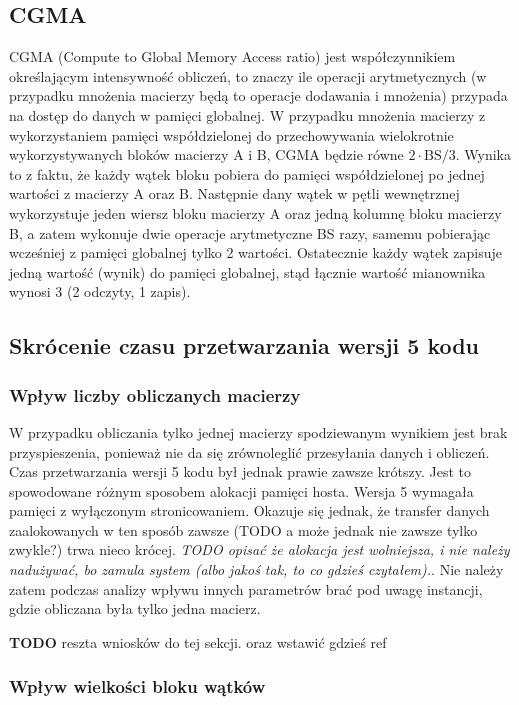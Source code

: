 \documentclass[12pt,a4paper]{article}
\begin{document}
\subsection{CGMA}

CGMA (Compute to Global Memory Access ratio) jest współczynnikiem określającym intensywność obliczeń, to znaczy ile operacji arytmetycznych (w przypadku mnożenia macierzy będą to operacje dodawania i mnożenia) przypada na dostęp do danych w pamięci globalnej. W przypadku mnożenia macierzy z wykorzystaniem pamięci współdzielonej do przechowywania wielokrotnie wykorzystywanych bloków macierzy A i B, CGMA będzie równe $2 \cdot \text{BS} / 3$. Wynika to z faktu, że każdy wątek bloku pobiera do pamięci współdzielonej po jednej wartości z macierzy A oraz B. Następnie dany wątek w pętli wewnętrznej wykorzystuje jeden wiersz bloku macierzy A oraz jedną kolumnę bloku macierzy B, a zatem wykonuje dwie operacje arytmetyczne BS razy, samemu pobierając wcześniej z pamięci globalnej tylko 2 wartości. Ostatecznie każdy wątek zapisuje jedną wartość (wynik) do pamięci globalnej, stąd łącznie wartość mianownika wynosi 3 (2 odczyty, 1 zapis).

\subsection{Skrócenie czasu przetwarzania wersji 5 kodu}

\subsubsection*{Wpływ liczby obliczanych macierzy}

W przypadku obliczania tylko jednej macierzy spodziewanym wynikiem jest brak przyspieszenia, ponieważ nie da się zrównoleglić przesyłania danych i obliczeń. Czas przetwarzania wersji 5 kodu był jednak prawie zawsze krótszy. Jest to spowodowane różnym sposobem alokacji pamięci hosta. Wersja 5 wymagała pamięci z wyłączonym stronicowaniem. Okazuje się jednak, że transfer danych zaalokowanych w ten sposób zawsze (TODO a może jednak nie zawsze tylko zwykle?) trwa nieco krócej. \textit{TODO opisać że alokacja jest wolniejsza, i nie należy nadużywać, bo zamula system (albo jakoś tak, to co gdzieś czytałem).}. Nie należy zatem podczas analizy wpływu innych parametrów brać pod uwagę instancji, gdzie obliczana była tylko jedna macierz.

\textbf{TODO} reszta wniosków do tej sekcji. oraz wstawić gdzieś ref

\subsubsection*{Wpływ wielkości bloku wątków}
\end{document}
